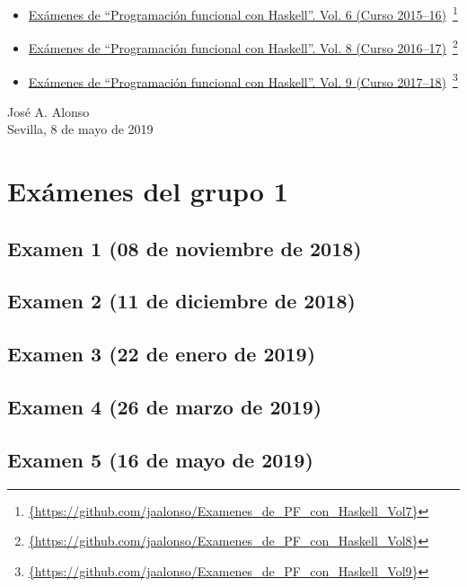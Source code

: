 \documentclass[a4paper,12pt,twoside]{book}
\begin{document}
\begin{itemize}
\item
  \href{https://github.com/jaalonso/Examenes_de_PF_con_Haskell_Vol7}
  {Exámenes de ``Programaci\'on funcional con Haskell''.
    Vol. 6 (Curso 2015--16)}\
    \footnote{\url{{https://github.com/jaalonso/Examenes_de_PF_con_Haskell_Vol7}}}

\item
  \href{https://github.com/jaalonso/Examenes_de_PF_con_Haskell_Vol8}
  {Exámenes de ``Programaci\'on funcional con Haskell''.
    Vol. 8 (Curso 2016--17)}\
    \footnote{\url{{https://github.com/jaalonso/Examenes_de_PF_con_Haskell_Vol8}}}

\item
  \href{https://github.com/jaalonso/Examenes_de_PF_con_Haskell_Vol9}
  {Exámenes de ``Programaci\'on funcional con Haskell''.
    Vol. 9 (Curso 2017--18)}\
    \footnote{\url{{https://github.com/jaalonso/Examenes_de_PF_con_Haskell_Vol9}}}

\end{itemize}
     
\begin{flushright}
  José A. Alonso \\
  Sevilla, 8 de mayo de 2019
\end{flushright}

\chapter{Exámenes del grupo 1}
\section{Examen 1 (08 de noviembre de 2018)}
\section{Examen 2 (11 de diciembre de 2018)}
\section{Examen 3 (22 de enero de 2019)}
 \label{examen_18_19_1_3}
\section{Examen 4 (26 de marzo de 2019)}
\section{Examen 5 (16 de mayo de 2019)}
\end{document}
